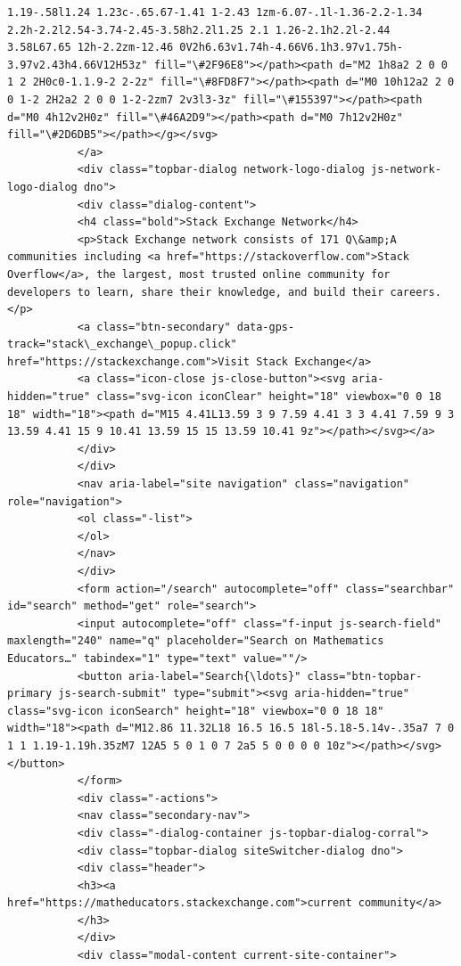 \documentclass[11pt]{article}
\begin{document}
\begin{Verbatim}[commandchars=\\\{\}]
1.19-.58l1.24 1.23c-.65.67-1.41 1-2.43 1zm-6.07-.1l-1.36-2.2-1.34 2.2h-2.2l2.54-3.74-2.45-3.58h2.2l1.25 2.1 1.26-2.1h2.2l-2.44 3.58L67.65 12h-2.2zm-12.46 0V2h6.63v1.74h-4.66V6.1h3.97v1.75h-3.97v2.43h4.66V12H53z" fill="\#2F96E8"></path><path d="M2 1h8a2 2 0 0 1 2 2H0c0-1.1.9-2 2-2z" fill="\#8FD8F7"></path><path d="M0 10h12a2 2 0 0 1-2 2H2a2 2 0 0 1-2-2zm7 2v3l3-3z" fill="\#155397"></path><path d="M0 4h12v2H0z" fill="\#46A2D9"></path><path d="M0 7h12v2H0z" fill="\#2D6DB5"></path></g></svg>
           </a>
           <div class="topbar-dialog network-logo-dialog js-network-logo-dialog dno">
           <div class="dialog-content">
           <h4 class="bold">Stack Exchange Network</h4>
           <p>Stack Exchange network consists of 171 Q\&amp;A communities including <a href="https://stackoverflow.com">Stack Overflow</a>, the largest, most trusted online community for developers to learn, share their knowledge, and build their careers.</p>
           <a class="btn-secondary" data-gps-track="stack\_exchange\_popup.click" href="https://stackexchange.com">Visit Stack Exchange</a>
           <a class="icon-close js-close-button"><svg aria-hidden="true" class="svg-icon iconClear" height="18" viewbox="0 0 18 18" width="18"><path d="M15 4.41L13.59 3 9 7.59 4.41 3 3 4.41 7.59 9 3 13.59 4.41 15 9 10.41 13.59 15 15 13.59 10.41 9z"></path></svg></a>
           </div>
           </div>
           <nav aria-label="site navigation" class="navigation" role="navigation">
           <ol class="-list">
           </ol>
           </nav>
           </div>
           <form action="/search" autocomplete="off" class="searchbar" id="search" method="get" role="search">
           <input autocomplete="off" class="f-input js-search-field" maxlength="240" name="q" placeholder="Search on Mathematics Educators…" tabindex="1" type="text" value=""/>
           <button aria-label="Search{\ldots}" class="btn-topbar-primary js-search-submit" type="submit"><svg aria-hidden="true" class="svg-icon iconSearch" height="18" viewbox="0 0 18 18" width="18"><path d="M12.86 11.32L18 16.5 16.5 18l-5.18-5.14v-.35a7 7 0 1 1 1.19-1.19h.35zM7 12A5 5 0 1 0 7 2a5 5 0 0 0 0 10z"></path></svg></button>
           </form>
           <div class="-actions">
           <nav class="secondary-nav">
           <div class="-dialog-container js-topbar-dialog-corral">
           <div class="topbar-dialog siteSwitcher-dialog dno">
           <div class="header">
           <h3><a href="https://matheducators.stackexchange.com">current community</a>
           </h3>
           </div>
           <div class="modal-content current-site-container">

\end{Verbatim}
\end{document}
